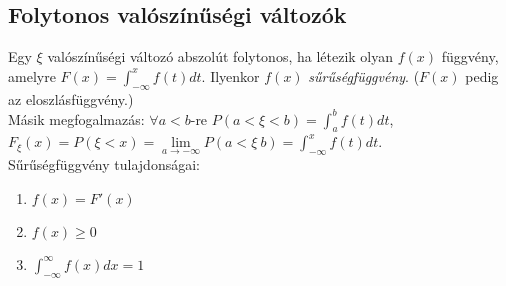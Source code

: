 \documentclass[margin=0px]{article}
\begin{document}
\subsection{Folytonos valószínűségi változók}

Egy $\xi$ valószínűségi változó abszolút folytonos, ha létezik olyan $f(x)$ függvény, amelyre $F(x) = \int_{-\infty}^{x}{f(t) dt}$. Ilyenkor $f(x)$ \textit{sűrűségfüggvény}. ($F(x)$ pedig az eloszlásfüggvény.) \\
Másik megfogalmazás: $\forall a < b$-re $P(a < \xi < b) = \int_{a}^{b}{f(t)dt}$, $F_{\xi}(x) = P(\xi < x) = \lim\limits_{a \to -\infty}{P(a < \xi \ b)} = \int_{-\infty}^{x}{f(t)dt}$. \\
Sűrűségfüggvény tulajdonságai:
\begin{enumerate}
    \item $f(x) = F'(x)$
    \item $f(x) \geq 0$
    \item $\int_{-\infty}^{\infty}{f(x)dx} = 1$
\end{enumerate}
\end{document}
